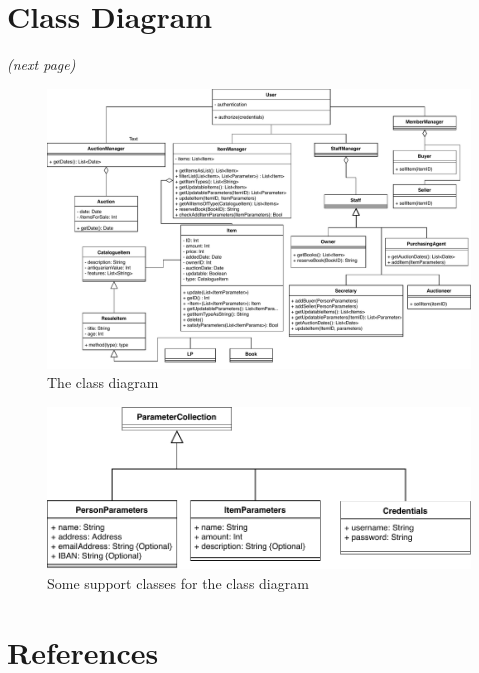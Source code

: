 \documentclass{article}
\begin{document}
\section{Class Diagram}
\textit{(next page)}
\begin{landscape}
\begin{figure}[H]
	\includegraphics[scale=.85]{uml/classdiagramUPD2.pdf}
	\caption*{The class diagram}
\end{figure}
\end{landscape}

\begin{figure}[H]
	\includegraphics{uml/classdiagramsupport.pdf}
	\caption*{Some support classes for the class diagram}
\end{figure}

\section{References}
\end{document}

